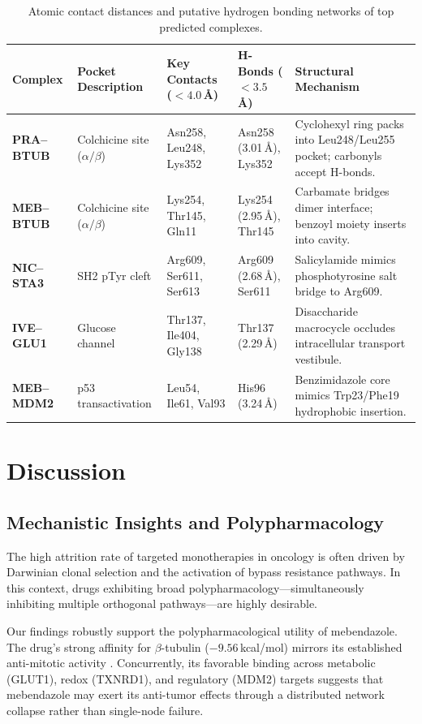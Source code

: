 \documentclass[10pt,a4paper,twocolumn]{article}
\begin{document}
\begin{table}[!ht]
\centering
\caption{Atomic contact distances and putative hydrogen bonding networks of top predicted complexes.}
\label{tab:contacts}
\small
\begin{tabularx}{\textwidth}{l l l l X}
\toprule
\textbf{Complex} & \textbf{Pocket Description} & \textbf{Key Contacts ($< 4.0$\,\AA)} & \textbf{H-Bonds ($< 3.5$\,\AA)} & \textbf{Structural Mechanism} \\
\midrule
\textbf{PRA--BTUB} & Colchicine site ($\alpha/\beta$) & Asn258, Leu248, Lys352 & Asn258 (3.01\,\AA), Lys352 & Cyclohexyl ring packs into Leu248/Leu255 pocket; carbonyls accept H-bonds. \\
\textbf{MEB--BTUB} & Colchicine site ($\alpha/\beta$) & Lys254, Thr145, Gln11 & Lys254 (2.95\,\AA), Thr145 & Carbamate bridges dimer interface; benzoyl moiety inserts into cavity. \\
\textbf{NIC--STA3} & SH2 pTyr cleft & Arg609, Ser611, Ser613 & Arg609 (2.68\,\AA), Ser611 & Salicylamide mimics phosphotyrosine salt bridge to Arg609. \\
\textbf{IVE--GLU1} & Glucose channel & Thr137, Ile404, Gly138 & Thr137 (2.29\,\AA) & Disaccharide macrocycle occludes intracellular transport vestibule. \\
\textbf{MEB--MDM2} & p53 transactivation & Leu54, Ile61, Val93 & His96 (3.24\,\AA) & Benzimidazole core mimics Trp23/Phe19 hydrophobic insertion. \\
\bottomrule
\end{tabularx}
\end{table}

\section{Discussion}

\subsection{Mechanistic Insights and Polypharmacology}
The high attrition rate of targeted monotherapies in oncology is often driven by Darwinian clonal selection and the activation of bypass resistance pathways. In this context, drugs exhibiting broad polypharmacology—simultaneously inhibiting multiple orthogonal pathways—are highly desirable. 

Our findings robustly support the polypharmacological utility of mebendazole. The drug's strong affinity for $\beta$-tubulin ($-9.56$\,kcal/mol) mirrors its established anti-mitotic activity \cite{bai2011}. Concurrently, its favorable binding across metabolic (GLUT1), redox (TXNRD1), and regulatory (MDM2) targets suggests that mebendazole may exert its anti-tumor effects through a distributed network collapse rather than single-node failure. 
\end{document}
